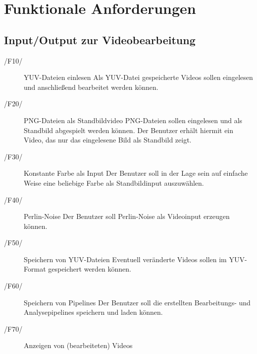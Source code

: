 \section{Funktionale Anforderungen}

\subsection{Input/Output zur Videobearbeitung}
 
\begin{description}
        \item[/F10/]YUV-Dateien einlesen \label{F10}\newline
                Als YUV-Datei gespeicherte Videos sollen eingelesen und anschließend bearbeitet werden können.
        \item[/F20/]PNG-Dateien als Standbildvideo \label{F20}\newline
                PNG-Dateien sollen eingelesen und als Standbild abgespielt werden können. Der Benutzer erhält hiermit ein Video, das nur das eingelesene Bild als Standbild zeigt.
        \item[/F30/]Konstante Farbe als Input \newline
                Der Benutzer soll in der Lage sein auf einfache Weise eine beliebige Farbe als Standbildinput auszuwählen.
        \item[/F40/]Perlin-Noise \newline
                Der Benutzer soll Perlin-Noise als Videoinput erzeugen können.
        \item[/F50/]Speichern von YUV-Dateien \newline
                Eventuell veränderte Videos sollen im YUV-Format gespeichert werden können.
        \item[/F60/]Speichern von Pipelines \label{F60}\newline
                Der Benutzer soll die erstellten Bearbeitungs- und Analysepipelines speichern und laden können.
        \item[/F70/]Anzeigen von (bearbeiteten) Videos
\end{description}
 
